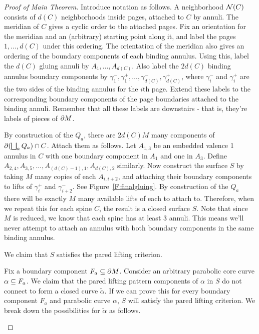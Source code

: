 \begin{proof}[Proof of Main Theorem]
Introduce notation as follows. A neighborhood $\mathcal{N}(C)$ consists of $d(C)$
neighborhoods inside pages, attached to $C$ by annuli. The meridian of $C$
gives a cyclic order to the attached pages.  Fix an orientation for the
meridian and an (arbitrary) starting point along it, and label the pages $1,
\dots, d(C)$ under this ordering.  The orientation of the meridian also gives
an ordering of the boundary components of each binding  annulus.  Using this,
label the $d(C)$ gluing annuli by $A_1,\dots,A_{d(C)}$. Also label the $2d(C)$
binding annulus boundary components by $\gamma_1^-,\gamma_1^+,\dots,
\gamma_{d(C)}^-,\gamma_{d(C)}^+$, where $\gamma_i^-$ and $\gamma_i^+$ are the
two sides of the binding annulus for the $i$th page.  Extend these labels to
the corresponding boundary components of the page boundaries attached to the
binding annuli.  Remember that all these labels are downstairs - that is,
they're labels of pieces of $\partial M$.

By construction of the $Q_a$, there are $2d(C)M$ many components of
$\partial(\bigsqcup_a Q_a) \cap C$. Attach them as follows. Let $A_{1,3}$ be an
embedded valence 1 annulus in $C$ with one boundary component in $A_1$ and one
in $A_3$. Define $A_{2,4},A_{3,5},\dots,A_{(d(C)-1),1},A_{d(C),2}$ similarly.
Now construct the surface $S$ by taking $M$ many copies of each $A_{i,i+2}$,
and attaching their boundary components to lifts of $\gamma_i^+$ and
$\gamma_{i+2}^-$. See Figure~\ref{F:finalgluing}. By construction of the $Q_a$
there will be exactly $M$ many available lifts of each to attach to. Therefore,
when we repeat this for each spine $C$, the result is a closed surface $S$.
Note that since $M$ is reduced, we know that each spine has at least 3 annuli.
This means we'll never attempt to attach an annulus with both boundary
components in the same binding annulus.


We claim that $S$ satisfies the pared lifting criterion.

Fix a boundary component $F_a \subseteq \partial M$. Consider an arbitrary parabolic core
curve $\alpha \subseteq F_a$. We claim that the pared lifting pattern components of
$\alpha$ in $S$ do not connect to form a closed curve $\widetilde{\alpha}$.  If
we can prove this for every boundary component $F_a$ and parabolic curve
$\alpha$, $S$ will satisfy the pared lifting criterion.  We break down the
possibilities for $\widetilde{\alpha}$ as follows.

\begin{enumerate}


\end{enumerate}
\end{proof}
